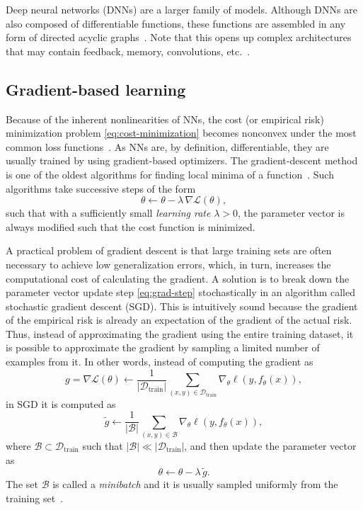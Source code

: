 
Deep neural networks (DNNs) are a larger family of models.
Although DNNs are also composed of differentiable functions, these functions are assembled in any form of directed acyclic graphs~\cite{murphyMachineLearningProbabilistic2013}.
Note that this opens up complex architectures that may contain feedback, memory, convolutions, etc.~\cite {Goodfellow-et-al-2016}.

\subsection{Gradient-based learning}

Because of the inherent nonlinearities of NNs, the cost (or empirical risk) minimization problem \eqref{eq:cost-minimization} becomes nonconvex under the most common loss functions~\cite{Goodfellow-et-al-2016}.
As NNs are, by definition, differentiable, they are usually trained by using gradient-based optimizers.
The gradient-descent method is one of the oldest algorithms for finding local minima of a function~\cite{cauchy1847}.
Such algorithms take successive steps of the form
\begin{equation}\label{eq:grad-step}
    \theta \gets \theta - \lambda\, \nabla \mathcal{L}(\theta)
,\end{equation}
such that with a sufficiently small \emph{learning rate} $\lambda>0$, the parameter vector is always modified such that the cost function is minimized.

A practical problem of gradient descent is that large training sets are often necessary to achieve low generalization errors, which, in turn, increases the computational cost of calculating the gradient.
A solution is to break down the parameter vector update step \eqref{eq:grad-step} stochastically in an algorithm called stochastic gradient descent (SGD).
This is intuitively sound because the gradient of the empirical risk is already an expectation of the gradient of the actual risk. 
Thus, instead of approximating the gradient using the entire training dataset, it is possible to approximate the gradient by sampling a limited number of examples from it.
In other words, instead of computing the gradient as \[
    g = \nabla \mathcal{L}(\theta) \gets \frac{1}{|\mathcal{D}_\textrm{train}|}\sum_{(x,y)\in \mathcal{D}_\textrm{train}} \nabla_\theta \ell(y,f_\theta(x))
,\] in SGD it is computed as \[
\widetilde{g} \gets \frac{1}{|\mathcal{B}|}\sum_{(x,y)\in \mathcal{B}} \nabla_\theta \ell(y,f_\theta(x)) 
,\] where $\mathcal{B}\subset \mathcal{D}_\textrm{train}$ such that $|\mathcal{B}|\ll |\mathcal{D}_\textrm{train}|$, and then update the parameter vector as \[
\theta \gets \theta -\lambda\, \widetilde{g}
.\] 
The set $\mathcal{B}$ is called a \emph{minibatch} and it is usually sampled uniformly from the training set~\cite{Goodfellow-et-al-2016}.

